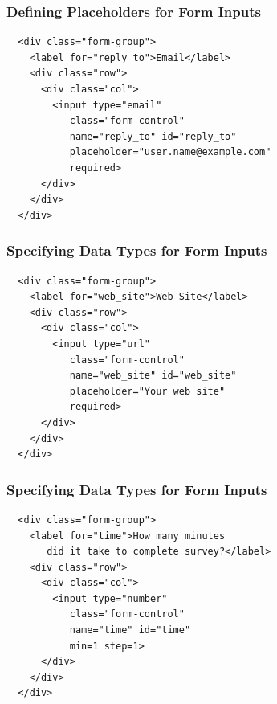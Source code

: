 \documentclass[14pt,aspectratio=169]{beamer}
\begin{document}
%
\begin{frame}[fragile]
  \frametitle{Defining Placeholders for Form Inputs}
  \normalsize
  \begin{minipage}{6in}
    \vspace*{.1in}
    \begin{verbatim}
  <div class="form-group">
    <label for="reply_to">Email</label>
    <div class="row">
      <div class="col">
        <input type="email"
           class="form-control"
           name="reply_to" id="reply_to"
           placeholder="user.name@example.com"
           required>
      </div>
    </div>
  </div>
    \end{verbatim}
  \end{minipage}
\end{frame}

%
\begin{frame}[fragile]
  \frametitle{Specifying Data Types for Form Inputs}
  \normalsize
  \begin{minipage}{6in}
    \vspace*{.1in}
    \begin{verbatim}
  <div class="form-group">
    <label for="web_site">Web Site</label>
    <div class="row">
      <div class="col">
        <input type="url"
           class="form-control"
           name="web_site" id="web_site"
           placeholder="Your web site"
           required>
      </div>
    </div>
  </div>
    \end{verbatim}
  \end{minipage}
\end{frame}

%
\begin{frame}[fragile]
  \frametitle{Specifying Data Types for Form Inputs}
  \normalsize
  \begin{minipage}{6in}
    \vspace*{.1in}
    \begin{verbatim}
  <div class="form-group">
    <label for="time">How many minutes
       did it take to complete survey?</label>
    <div class="row">
      <div class="col">
        <input type="number"
           class="form-control"
           name="time" id="time"
           min=1 step=1>
      </div>
    </div>
  </div>
    \end{verbatim}
  \end{minipage}
\end{frame}
\end{document}
